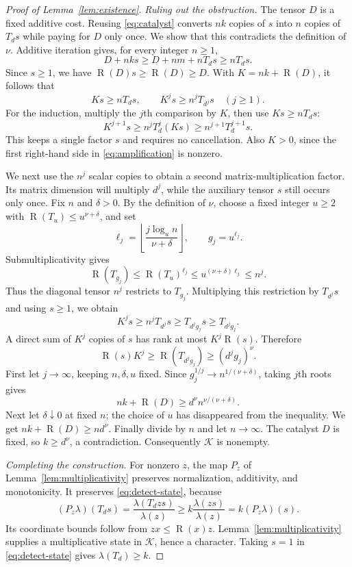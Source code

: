 \documentclass[11pt]{article}
\theoremstyle{definition}
\theoremstyle{remark}
\DeclareMathOperator{\rank}{R}
\numberwithin{equation}{section}
\begin{document}
\begin{proof}[Proof of Lemma~\ref{lem:existence}]
\medskip
\noindent\emph{Ruling out the obstruction.}
The tensor $D$ is a fixed additive cost. Reusing
\eqref{eq:catalyst} converts $nk$ copies of $s$ into $n$ copies of
$T_ds$ while paying for $D$ only once. We show that this contradicts
the definition of $\nu$. Additive iteration gives, for every integer $n\geq1$,
\[
 D+nks\geq D+nm+nT_ds\geq nT_ds.
\]
Since $s\geq1$, we have $\rank(D)s\geq\rank(D)\geq D$.
With $K=nk+\rank(D)$, it follows that
\begin{equation}\label{eq:amplification}
 Ks\geq nT_ds,\qquad K^js\geq n^jT_{d^j}s\quad(j\geq1).
\end{equation}
For the induction, multiply the $j$th comparison by $K$, then use
$Ks\geq nT_ds$:
\[
 K^{j+1}s\geq n^jT_d^j(Ks)\geq n^{j+1}T_d^{j+1}s.
\]
This keeps a single factor $s$ and requires no cancellation.
Also $K>0$, since the first right-hand side in
\eqref{eq:amplification} is nonzero.

We next use the $n^j$ scalar copies to obtain a second
matrix-multiplication factor. Its matrix dimension will multiply
$d^j$, while the auxiliary tensor $s$ still occurs only once.
Fix $n$ and $\delta>0$. By the definition of $\nu$, choose a fixed
integer $u\geq2$ with $\rank(T_u)\leq u^{\nu+\delta}$, and set
\[
 \ell_j=\left\lfloor\frac{j\log_u n}{\nu+\delta}\right\rfloor,
 \qquad g_j=u^{\ell_j}.
\]
Submultiplicativity gives
\[
 \rank(T_{g_j})\leq\rank(T_u)^{\ell_j}
 \leq u^{(\nu+\delta)\ell_j}\leq n^j.
\]
Thus the diagonal tensor $n^j$ restricts to $T_{g_j}$. Multiplying
this restriction by $T_{d^j}s$ and using $s\geq1$, we obtain
\[
 K^js\geq n^jT_{d^j}s\geq T_{d^jg_j}s\geq T_{d^jg_j}.
\]
A direct sum of $K^j$ copies of $s$ has rank at most $K^j\rank(s)$.
Therefore
\[
 \rank(s)K^j\geq\rank(T_{d^jg_j})\geq(d^jg_j)^\nu.
\]
First let $j\to\infty$, keeping $n,\delta,u$ fixed. Since
$g_j^{1/j}\to n^{1/(\nu+\delta)}$, taking $j$th roots gives
\[
 nk+\rank(D)\geq d^\nu n^{\nu/(\nu+\delta)}.
\]
Next let $\delta\downarrow0$ at fixed $n$; the choice of $u$ has
disappeared from the inequality. We get
$nk+\rank(D)\geq nd^\nu$. Finally divide by $n$ and let
$n\to\infty$. The catalyst $D$ is fixed, so $k\geq d^\nu$,
a contradiction. Consequently $\mathcal K$ is nonempty.

\medskip
\noindent\emph{Completing the construction.}
For nonzero $z$, the map $P_z$ of Lemma~\ref{lem:multiplicativity}
preserves normalization, additivity, and monotonicity. It preserves
\eqref{eq:detect-state}, because
\[
 (P_z\lambda)(T_ds)=\frac{\lambda(T_dzs)}{\lambda(z)}
 \geq k\frac{\lambda(zs)}{\lambda(z)}=k(P_z\lambda)(s).
\]
Its coordinate bounds follow from $zx\leq\rank(x)z$.
Lemma~\ref{lem:multiplicativity} supplies a multiplicative state in
$\mathcal K$, hence a character. Taking $s=1$ in
\eqref{eq:detect-state} gives $\lambda(T_d)\geq k$.
\end{proof}
\end{document}
